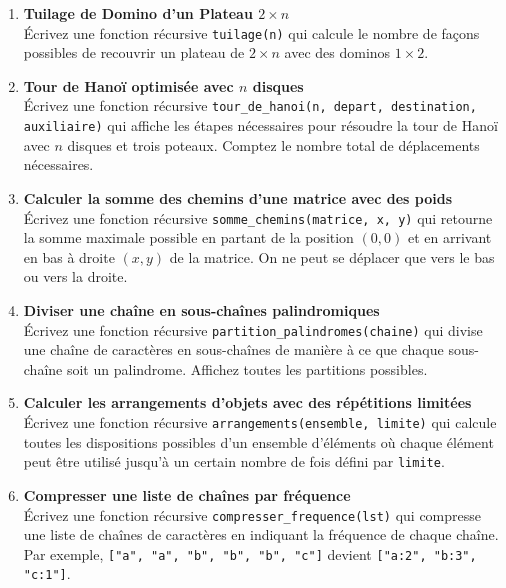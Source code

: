 

\begin{enumerate}

    \item \textbf{Tuilage de Domino d'un Plateau $2 \times n$} \\
    Écrivez une fonction récursive \texttt{tuilage(n)} qui calcule le nombre de façons possibles de recouvrir un plateau de $2 \times n$ avec des dominos $1 \times 2$. 

    \item \textbf{Tour de Hanoï optimisée avec $n$ disques} \\
    Écrivez une fonction récursive \texttt{tour\_de\_hanoi(n, depart, destination, auxiliaire)} qui affiche les étapes nécessaires pour résoudre la tour de Hanoï avec $n$ disques et trois poteaux. Comptez le nombre total de déplacements nécessaires.

    \item \textbf{Calculer la somme des chemins d'une matrice avec des poids} \\
    Écrivez une fonction récursive \texttt{somme\_chemins(matrice, x, y)} qui retourne la somme maximale possible en partant de la position $(0, 0)$ et en arrivant en bas à droite $(x, y)$ de la matrice. On ne peut se déplacer que vers le bas ou vers la droite.

    \item \textbf{Diviser une chaîne en sous-chaînes palindromiques} \\
    Écrivez une fonction récursive \texttt{partition\_palindromes(chaine)} qui divise une chaîne de caractères en sous-chaînes de manière à ce que chaque sous-chaîne soit un palindrome. Affichez toutes les partitions possibles.

    \item \textbf{Calculer les arrangements d'objets avec des répétitions limitées} \\
    Écrivez une fonction récursive \texttt{arrangements(ensemble, limite)} qui calcule toutes les dispositions possibles d'un ensemble d'éléments où chaque élément peut être utilisé jusqu'à un certain nombre de fois défini par \texttt{limite}.

    \item \textbf{Compresser une liste de chaînes par fréquence} \\
    Écrivez une fonction récursive \texttt{compresser\_frequence(lst)} qui compresse une liste de chaînes de caractères en indiquant la fréquence de chaque chaîne. Par exemple, \texttt{["a", "a", "b", "b", "b", "c"]} devient \texttt{["a:2", "b:3", "c:1"]}.


\end{enumerate}
